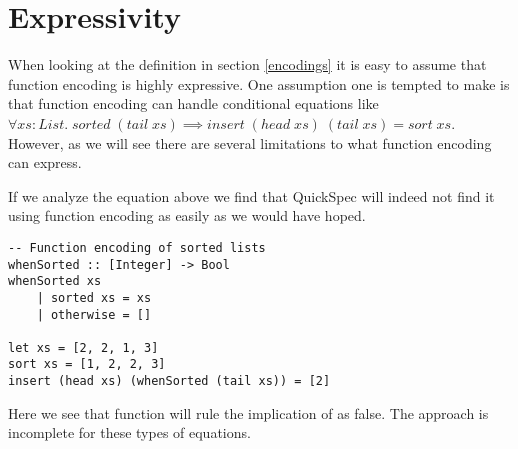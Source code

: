 \section{Expressivity}

When looking at the definition in 
section \ref{encodings} it is easy to assume
that function encoding is highly expressive.
One assumption one is tempted to make is that
function encoding can handle conditional equations like\\
$\forall xs : List.\;sorted\;(tail\; xs) \implies insert\;(head\;xs)\;(tail\;xs)=sort\;xs$.
However, as we will see there are several limitations to what function encoding can express.

If we analyze the equation above we find that QuickSpec will indeed not find it
using function encoding as easily as we would have hoped.
\begin{verbatim}
-- Function encoding of sorted lists
whenSorted :: [Integer] -> Bool
whenSorted xs
    | sorted xs = xs
    | otherwise = []

let xs = [2, 2, 1, 3]
sort xs = [1, 2, 2, 3]
insert (head xs) (whenSorted (tail xs)) = [2]
\end{verbatim}
Here we see that function will rule the implication of as false. The approach is
incomplete for these types of equations.

%
%
%



